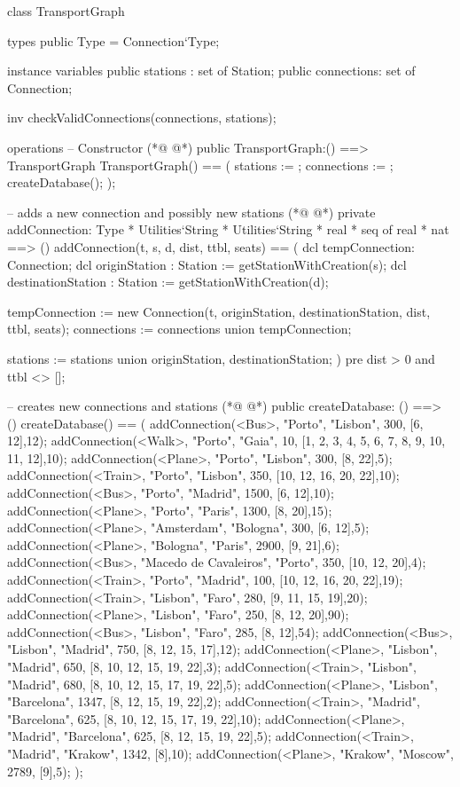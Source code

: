 \begin{vdmpp}[breaklines=true]
class TransportGraph

types
 public Type = Connection`Type;
 
instance variables
 public stations : set of Station;
 public connections: set of Connection;
 
 inv checkValidConnections(connections, stations);

operations
 -- Constructor
(*@
\label{TransportGraph:14}
@*)
 public TransportGraph:() ==> TransportGraph
 TransportGraph() ==
 (
  stations := {};
  connections := {};
  createDatabase();
 );
 
 -- adds a new connection and possibly new stations
(*@
\label{addConnection:23}
@*)
 private addConnection: Type * Utilities`String * Utilities`String * real * seq of real * nat ==> ()
 addConnection(t, s, d, dist, ttbl, seats) ==
 (
  dcl tempConnection: Connection;
  dcl originStation : Station := getStationWithCreation(s);
  dcl destinationStation : Station := getStationWithCreation(d);
  
  tempConnection := new Connection(t, originStation, destinationStation, dist, ttbl, seats);
  connections := connections union {tempConnection};
  
  stations := stations union {originStation, destinationStation};
 )
 pre dist > 0 and ttbl <> [];
  
 -- creates new connections and stations
(*@
\label{createDatabase:38}
@*)
 public createDatabase: () ==> ()
  createDatabase() ==
  (
   addConnection(<Bus>,   "Porto", "Lisbon", 300, [6, 12],12);
   addConnection(<Walk>,   "Porto", "Gaia", 10, [1, 2, 3, 4, 5, 6, 7, 8, 9, 10, 11, 12],10);
   addConnection(<Plane>, "Porto", "Lisbon", 300, [8, 22],5);
   addConnection(<Train>, "Porto", "Lisbon", 350, [10, 12, 16, 20, 22],10);
   addConnection(<Bus>,   "Porto", "Madrid", 1500, [6, 12],10);
   addConnection(<Plane>,   "Porto", "Paris", 1300, [8, 20],15);
   addConnection(<Plane>, "Amsterdam", "Bologna", 300, [6, 12],5);
   addConnection(<Plane>, "Bologna", "Paris", 2900, [9, 21],6);
   addConnection(<Bus>,   "Macedo de Cavaleiros", "Porto", 350, [10, 12, 20],4);
   addConnection(<Train>, "Porto", "Madrid", 100, [10, 12, 16, 20, 22],19);
   addConnection(<Train>, "Lisbon", "Faro", 280, [9, 11, 15, 19],20);
   addConnection(<Plane>, "Lisbon", "Faro", 250, [8, 12, 20],90);
   addConnection(<Bus>,   "Lisbon", "Faro", 285, [8, 12],54);
   addConnection(<Bus>, "Lisbon", "Madrid", 750, [8, 12, 15, 17],12);
   addConnection(<Plane>, "Lisbon", "Madrid", 650, [8, 10, 12, 15, 19, 22],3);
   addConnection(<Train>, "Lisbon", "Madrid", 680, [8, 10, 12, 15, 17, 19, 22],5);
   addConnection(<Plane>, "Lisbon", "Barcelona", 1347, [8, 12, 15, 19, 22],2);
   addConnection(<Train>, "Madrid", "Barcelona", 625, [8, 10, 12, 15, 17, 19, 22],10);
   addConnection(<Plane>, "Madrid", "Barcelona", 625, [8, 12, 15, 19, 22],5);
   addConnection(<Train>, "Madrid", "Krakow", 1342, [8],10);
   addConnection(<Plane>, "Krakow", "Moscow", 2789, [9],5);
  ); 
  

\end{vdmpp}
